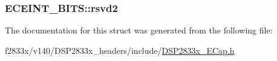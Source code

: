 \subsubsection[{rsvd2}]{ E\+C\+E\+I\+N\+T\+\_\+\+B\+I\+T\+S\+::rsvd2}\label{struct_e_c_e_i_n_t___b_i_t_s_a05a2a5468e9c0421d82b10b9c6bafd30}


The documentation for this struct was generated from the following file\+:\begin{DoxyCompactItemize}
\item 
f2833x/v140/\+D\+S\+P2833x\+\_\+headers/include/\hyperlink{_d_s_p2833x___e_cap_8h}{D\+S\+P2833x\+\_\+\+E\+Cap.\+h}\end{DoxyCompactItemize}
